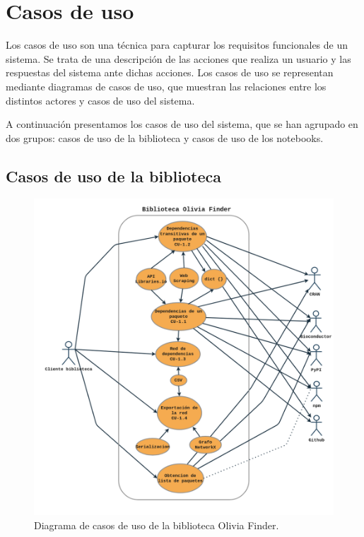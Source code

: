 \section{Casos de uso}

Los casos de uso son una técnica para capturar los requisitos funcionales de un sistema. Se trata de una
descripción de las acciones que realiza un usuario y las respuestas del sistema ante dichas acciones.
Los casos de uso se representan mediante diagramas de casos de uso, que muestran las relaciones entre los distintos actores y casos de uso del sistema.

A continuación presentamos los casos de uso del sistema, que se han agrupado en dos grupos: casos de uso de la biblioteca y casos de uso de los notebooks.

\subsection{Casos de uso de la biblioteca}

\begin{figure}[ht!]
	\centering
	\includegraphics[width=1\textwidth]{img/anexos/CU_of.png}
	\caption{Diagrama de casos de uso de la biblioteca Olivia Finder.}
	\label{fig:casos_de_uso}
\end{figure}

